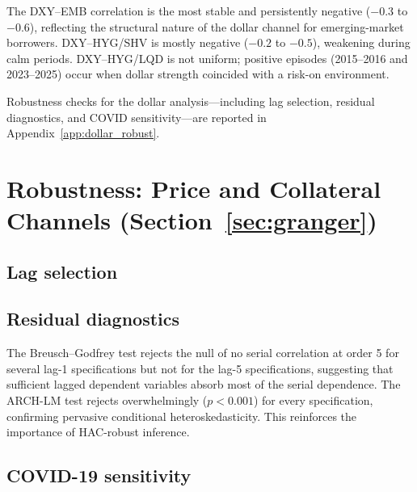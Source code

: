 \documentclass[12pt,a4paper]{article}
\begin{document}
The DXY--EMB correlation is the most stable and persistently negative ($-0.3$ to $-0.6$), reflecting the structural nature of the dollar channel for emerging-market borrowers. DXY--HYG/SHV is mostly negative ($-0.2$ to $-0.5$), weakening during calm periods. DXY--HYG/LQD is not uniform; positive episodes (2015--2016 and 2023--2025) occur when dollar strength coincided with a risk-on environment.

Robustness checks for the dollar analysis---including lag selection, residual diagnostics, and COVID sensitivity---are reported in Appendix~\ref{app:dollar_robust}.


\newpage
\appendix

\section{Robustness: Price and Collateral Channels (Section~\ref{sec:granger})}
\label{app:granger_robust}

\subsection{Lag selection}



\subsection{Residual diagnostics}



The Breusch--Godfrey test rejects the null of no serial correlation at order 5 for several lag-1 specifications but not for the lag-5 specifications, suggesting that sufficient lagged dependent variables absorb most of the serial dependence. The ARCH-LM test rejects overwhelmingly ($p < 0.001$) for every specification, confirming pervasive conditional heteroskedasticity. This reinforces the importance of HAC-robust inference.

\subsection{COVID-19 sensitivity}


\end{document}
